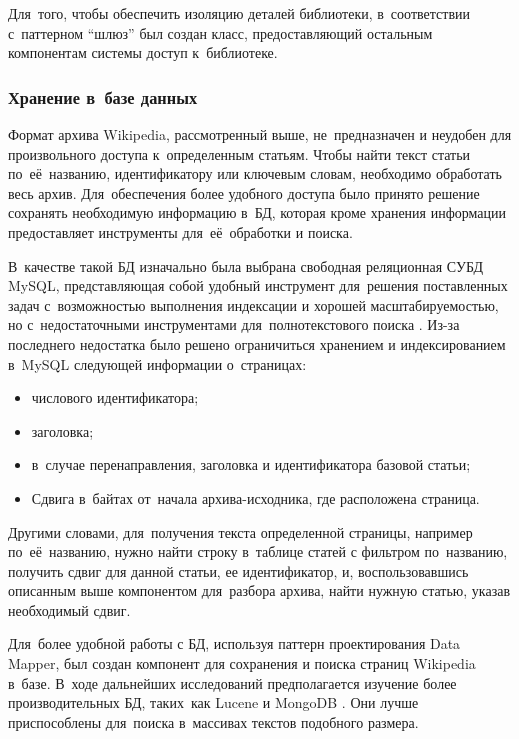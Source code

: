 Для~того, чтобы обеспечить изоляцию деталей библиотеки, 
в~соответствии с~паттерном ``шлюз'' \cite{patternGateway} был создан класс, 
предоставляющий остальным компонентам системы доступ к~библиотеке.

\subsubsection{Хранение в~базе данных}

Формат архива Wikipedia, рассмотренный выше, не~предназначен и неудобен для произвольного доступа к~определенным статьям. 
Чтобы найти текст статьи по~её~названию, идентификатору или ключевым словам,
необходимо обработать весь архив.
Для~обеспечения более удобного доступа было принято решение сохранять необходимую информацию в~БД,
которая кроме хранения информации предоставляет инструменты для~её~обработки и поиска.

В~качестве такой БД изначально была выбрана свободная реляционная 
СУБД MySQL, представляющая собой удобный инструмент для~решения поставленных задач 
с~возможностью выполнения индексации и хорошей масштабируемостью, 
но с~недостаточными инструментами для~полнотекстового поиска \cite{mysql}.
Из-за последнего недостатка было решено ограничиться хранением и индексированием в~MySQL следующей информации о~страницах:

\begin{itemize}

\item{числового идентификатора;}
\item {заголовка;}
\item {в~случае перенаправления, заголовка и идентификатора базовой статьи;}

\item {
Сдвига в~байтах от~начала архива-исходника, 
где расположена страница.
}

\end{itemize}

Другими словами, для~получения текста определенной страницы, например по~её~названию,
нужно найти строку в~таблице статей с фильтром по~названию,
получить сдвиг для данной статьи, ее идентификатор, и, 
воспользовавшись описанным выше компонентом для~разбора архива, найти нужную статью, 
указав необходимый сдвиг.

Для~более удобной работы с БД, используя паттерн проектирования Data Mapper\cite{patternMapper}, 
был создан компонент для сохранения и поиска страниц Wikipedia в~базе.
В~ходе дальнейших исследований предполагается изучение более производительных БД, таких~как 
Lucene \cite{lucene} и 
MongoDB \cite{mongodb}. 
Они лучше приспособлены для~поиска в~массивах текстов подобного размера.

